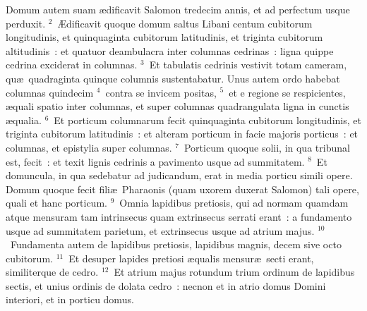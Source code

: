 \lettrine[lines=10,image=true,loversize=0.05,lraise=-0.03]{D}{}omum autem suam \ae dificavit Salomon tredecim annis, et ad perfectum usque perduxit.
${}^{2}$~\AE dificavit quoque domum saltus Libani centum cubitorum longitudinis, et quinquaginta cubitorum latitudinis, et triginta cubitorum altitudinis~: et quatuor deambulacra inter columnas cedrinas~: ligna quippe cedrina exciderat in columnas.
${}^{3}$~Et tabulatis cedrinis vestivit totam cameram, qu\ae\ quadraginta quinque columnis sustentabatur. Unus autem ordo habebat columnas quindecim
${}^{4}$~contra se invicem positas,
${}^{5}$~et e regione se respicientes, \ae quali spatio inter columnas, et super columnas quadrangulata ligna in cunctis \ae qualia.
${}^{6}$~Et porticum columnarum fecit quinquaginta cubitorum longitudinis, et triginta cubitorum latitudinis~: et alteram porticum in facie majoris porticus~: et columnas, et epistylia super columnas.
${}^{7}$~Porticum quoque solii, in qua tribunal est, fecit~: et texit lignis cedrinis a pavimento usque ad summitatem.
${}^{8}$~Et domuncula, in qua sedebatur ad judicandum, erat in media porticu simili opere. Domum quoque fecit fili\ae\ Pharaonis (quam uxorem duxerat Salomon) tali opere, quali et hanc porticum.
${}^{9}$~Omnia lapidibus pretiosis, qui ad normam quamdam atque mensuram tam intrinsecus quam extrinsecus serrati erant~: a fundamento usque ad summitatem parietum, et extrinsecus usque ad atrium majus.
${}^{10}$~Fundamenta autem de lapidibus pretiosis, lapidibus magnis, decem sive octo cubitorum.
${}^{11}$~Et desuper lapides pretiosi \ae qualis mensur\ae\ secti erant, similiterque de cedro.
${}^{12}$~Et atrium majus rotundum trium ordinum de lapidibus sectis, et unius ordinis de dolata cedro~: necnon et in atrio domus Domini interiori, et in porticu domus.


